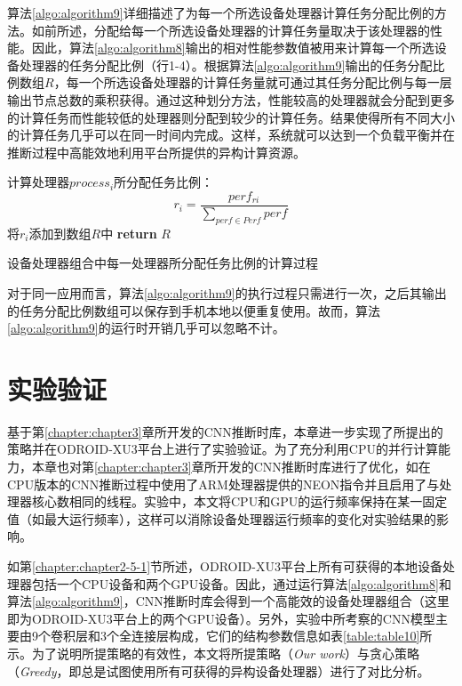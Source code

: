 算法\ref{algo:algorithm9}详细描述了为每一个所选设备处理器计算任务分配比例的方法。如前所述，分配给每一个所选设备处理器的计算任务量取决于该处理器的性能。因此，算法\ref{algo:algorithm8}输出的相对性能参数值被用来计算每一个所选设备处理器的任务分配比例（行1-4）。根据算法\ref{algo:algorithm9}输出的任务分配比例数组$R$，每一个所选设备处理器的计算任务量就可通过其任务分配比例与每一层输出节点总数的乘积获得。通过这种划分方法，性能较高的处理器就会分配到更多的计算任务而性能较低的处理器则分配到较少的计算任务。结果使得所有不同大小的计算任务几乎可以在同一时间内完成。这样，系统就可以达到一个负载平衡并在推断过程中高能效地利用平台所提供的异构计算资源。

\begin{algorithm}[htbp]
  \small
  \SetAlgoLined
    \begin{spacing}{0.85}
     {
        计算处理器$process_i$所分配任务比例：
        $$r_i=\frac{perf_{ri}}{\sum_{perf \in Perf}perf}$$
        将$r_i$添加到数组$R$中\;
    }
    \textbf{return} $R$\;
   \end{spacing}
  \caption{设备处理器组合中每一处理器所分配任务比例的计算过程}
  \label{algo:algorithm9}
\end{algorithm}

对于同一应用而言，算法\ref{algo:algorithm9}的执行过程只需进行一次，之后其输出的任务分配比例数组可以保存到手机本地以便重复使用。故而，算法\ref{algo:algorithm9}的运行时开销几乎可以忽略不计。


\section{实验验证}
\label{chapter:chapter4-4}
基于第\ref{chapter:chapter3}章所开发的CNN推断时库，本章进一步实现了所提出的策略并在ODROID-XU3平台上进行了实验验证。为了充分利用CPU的并行计算能力，本章也对第\ref{chapter:chapter3}章所开发的CNN推断时库进行了优化，如在CPU版本的CNN推断过程中使用了ARM处理器提供的NEON指令并且启用了与处理器核心数相同的线程。实验中，本文将CPU和GPU的运行频率保持在某一固定值（如最大运行频率），这样可以消除设备处理器运行频率的变化对实验结果的影响。

如第\ref{chapter:chapter2-5-1}节所述，ODROID-XU3平台上所有可获得的本地设备处理器包括一个CPU设备和两个GPU设备。因此，通过运行算法\ref{algo:algorithm8}和算法\ref{algo:algorithm9}，CNN推断时库会得到一个高能效的设备处理器组合（这里即为ODROID-XU3平台上的两个GPU设备）。另外，实验中所考察的CNN模型主要由9个卷积层和3个全连接层构成，它们的结构参数信息如表\ref{table:table10}所示。为了说明所提策略的有效性，本文将所提策略（\emph{Our work}）与贪心策略（\emph{Greedy}，即总是试图使用所有可获得的异构设备处理器）进行了对比分析。

